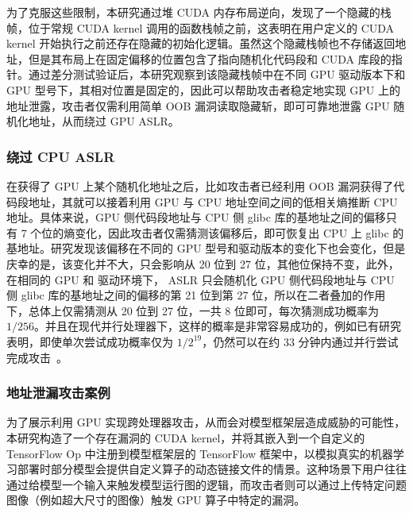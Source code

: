 为了克服这些限制，本研究通过堆 CUDA 内存布局逆向，发现了一个隐藏的栈帧，位于常规 CUDA kernel 调用的函数栈帧之前，这表明在用户定义的 CUDA kernel 开始执行之前还存在隐藏的初始化逻辑。虽然这个隐藏栈帧也不存储返回地址，但是其布局上在固定偏移的位置包含了指向随机化代码段和 CUDA 库段的指针。通过差分测试验证后，本研究观察到该隐藏栈帧中在不同 GPU 驱动版本下和 GPU 型号下，其相对位置是固定的，因此可以帮助攻击者稳定地实现 GPU 上的地址泄露，攻击者仅需利用简单 OOB 漏洞读取隐藏斩，即可可靠地泄露 GPU 随机化地址，从而绕过 GPU ASLR。

\subsubsection{绕过 CPU ASLR}
在获得了 GPU 上某个随机化地址之后，比如攻击者已经利用 OOB 漏洞获得了代码段地址，其就可以接着利用 GPU 与 CPU 地址空间之间的低相关熵推断 CPU 地址。具体来说，GPU 侧代码段地址与 CPU 侧 glibc 库的基地址之间的偏移只有 7 个位的熵变化，因此攻击者仅需猜测该偏移后，即可恢复出 CPU 上 glibc 的基地址。研究发现该偏移在不同的 GPU 型号和驱动版本的变化下也会变化，但是庆幸的是，该变化并不大，只会影响从 20 位到 27 位，其他位保持不变，此外，在相同的 GPU 和 驱动环境下， ASLR 只会随机化 GPU 侧代码段地址与 CPU 侧 glibc 库的基地址之间的偏移的第 21 位到第 27 位，所以在二者叠加的作用下，总体上仅需猜测从 20 位到 27 位，一共 8 位即可，每次猜测成功概率为 $1/256$。并且在现代并行处理器下，这样的概率是非常容易成功的，例如已有研究表明，即使单次尝试成功概率仅为 \(1/2^{19}\)，仍然可以在约 33 分钟内通过并行尝试完成攻击~\cite{binosi2024illusion}。

    

\subsubsection{地址泄漏攻击案例}
为了展示利用 GPU 实现跨处理器攻击，从而会对模型框架层造成威胁的可能性，本研究构造了一个存在漏洞的 CUDA kernel，并将其嵌入到一个自定义的 TensorFlow Op 中注册到模型框架层的 TensorFlow 框架中，以模拟真实的机器学习部署时部分模型会提供自定义算子的动态链接文件的情景。这种场景下用户往往通过给模型一个输入来触发模型运行图的逻辑，而攻击者则可以通过上传特定问题图像（例如超大尺寸的图像）触发 GPU 算子中特定的漏洞。


